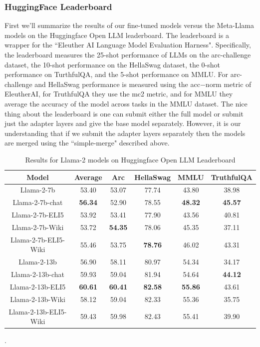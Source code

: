 \documentclass[11pt, oneside]{article}   	%
\begin{document}
\subsubsection{HuggingFace Leaderboard}
First we'll summarize the results of our fine-tuned models versus the Meta-Llama models on the Huggingface Open LLM leaderboard.
The leaderboard is a wrapper for the ``Eleuther AI Language Model Evaluation Harness". 
Specifically, the leaderboard measures the 25-shot performance of LLMs on the arc-challenge dataset, the 10-shot performance on the HellaSwag dataset, the 0-shot performance on TurthfulQA, and the 5-shot performance on MMLU. 
For arc-challenge and HellaSwag performance is measured using the acc$-$norm metric of EleutherAI, for TruthfulQA they use the mc2 metric, and for MMLU they average the accuracy of the model across tasks in the MMLU dataset.
The nice thing about the leaderboard is one can submit either the full model or submit just the adapter layers and give the base model separately.
However, it is our understanding that if we submit the adapter layers separately then the models are merged using the ``simple-merge" described above.
\begin{table}
\begin{center}
\begin{tabular}{|c|c|c|c|c|c|}
\hline
Model &          Average & Arc & HellaSwag & MMLU & TruthfulQA \\
\hline
Llama-2-7b&                  53.40               &   53.07            & 77.74              &  43.80                &  38.98 \\
Llama-2-7b-chat  &          \textbf{56.34} &  52.90              & 78.55             &  \textbf{48.32}    &  \textbf{45.57} \\
Llama-2-7b-ELI5  &           53.92             &  53.41              & 77.90             &  43.56                 & 40.81\\
Llama-2-7b-Wiki &           53.72              &  \textbf{54.35} & 78.06             &  45.35                 & 37.11\\
Llama-2-7b-ELI5-Wiki&    55.46               &  53.75              & \textbf{78.76}&  46.02                   & 43.31\\
\hhline{|=|=|=|=|=|=|}
Llama-2-13b &               56.90              &   58.11             & 80.97            &  54.34            & 34.17\\
Llama-2-13b-chat&        59.93              & 59.04               & 81.94            &  54.64            & \textbf{44.12}\\
Llama-2-13b-ELI5&          \textbf{60.61} &  \textbf{60.41}  & \textbf{82.58}&  \textbf{55.86}& 43.61\\
Llama-2-13b-Wiki&	        58.12             &  59.04               & 82.33            &  55.36            & 35.75\\
Llama-2-13b-ELI5-Wiki&   59.43             &  59.98               & 82.43            &  55.41            & 39.90 \\
\hline
\end{tabular}
\end{center}
\caption{Results for Llama-2 models on Huggingface Open LLM Leaderboard}.
\label{table:hfleaderboard}
\end{table}
\end{document}
